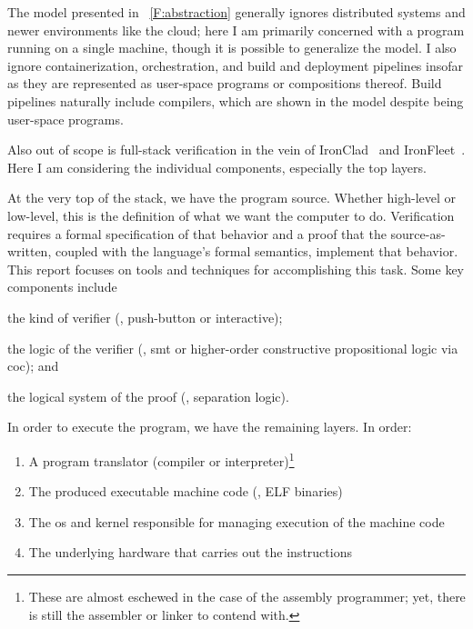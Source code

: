 The model presented in \figurename~\ref{F:abstraction} generally ignores
distributed systems and newer environments like the cloud; here I am primarily
concerned with a program running on a single machine, though it is possible to
generalize the model. I also ignore containerization, orchestration, and build
and deployment pipelines insofar as they are represented as user-space programs
or compositions thereof. Build pipelines naturally include compilers, which are
shown in the model despite being user-space programs.

Also out of scope is full-stack verification in the vein of
IronClad~\cite{hawblitzel2014ironclad} and
IronFleet~\cite{hawblitzel2015ironfleet}. Here I am considering the individual
components, especially the top layers.

At the very top of the stack, we have the program source. Whether high-level or
low-level, this is the definition of what we want the computer to do.
Verification requires a formal specification of that behavior and a proof that
the source-as-written, coupled with the language's formal semantics, implement
that behavior. This report focuses on tools and techniques for accomplishing
this task. Some key components include
\begin{inlist}
\item the kind of verifier (\eg, push-button or interactive);
\item the logic of the verifier (\eg, \gls{smt} or higher-order constructive
    propositional logic via \gls{coc}); and
\item the logical system of the proof (\eg, separation logic).
\end{inlist}

In order to execute the program, we have the remaining layers. In order:
\begin{enumerate}
    \item\label{i:stack_translator} A program translator (compiler or
        interpreter)\footnote{These are almost eschewed in the case of the
        assembly programmer; yet, there is still the assembler or linker to
        contend with.}
    \item\label{i:stack_asm} The produced executable machine code (\eg, ELF
        binaries)
    \item\label{i:stack_OS} The \gls{os} and kernel responsible for managing execution
        of the machine code
    \item\label{i:stack_hardware} The underlying hardware that carries out the
        instructions
\end{enumerate}

